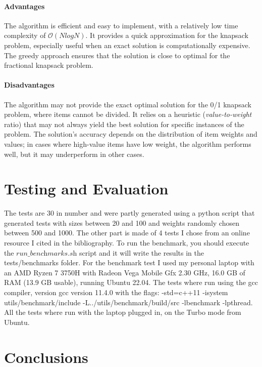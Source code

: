 \documentclass[runningheads]{llncs}
\begin{document}
\paragraph{Advantages}
The algorithm is efficient and easy to implement, with a relatively low time complexity of 
$\mathcal{O}(NlogN)$. It provides a quick approximation for the knapsack problem, especially useful
when an exact solution is computationally expensive. The greedy approach ensures that the solution
is close to optimal for the fractional knapsack problem.

\paragraph{Disadvantages}
The algorithm may not provide the exact optimal solution for the 0/1 knapsack problem, where items
cannot be divided. It relies on a heuristic (\textit{value-to-weight} ratio) that may not always
yield the best solution for specific instances of the problem. The solution's accuracy depends on 
the distribution of item weights and values; in cases where high-value items have low weight, the 
algorithm performs well, but it may underperform in other cases.

\section{Testing and Evaluation}
The tests are 30 in number and were partly generated using a python script that generated tests with
sizes between 20 and 100 and weights randomly chosen between 500 and 1000. The other part is made of
4 tests I chose from an online resource I cited in the bibliography. To run the benchmark, you should
execute the $\textit{run\_benchmarks.sh}$ script and it will write the results in the 
tests/benchmarks folder.
For the benchmark test I used my personal laptop with an AMD Ryzen 7 3750H with Radeon Vega Mobile
Gfx 2.30 GHz, 16.0 GB of RAM (13.9 GB usable), running Ubuntu 22.04. The tests where run using the
gcc compiler, version gcc version 11.4.0 with the flags: -std=c++11 -isystem utils/benchmark/include 
-L../utils/benchmark/build/src -lbenchmark -lpthread. All the tests where run with the laptop plugged
in, on the Turbo mode from Ubuntu.

\section{Conclusions}
\end{document}
